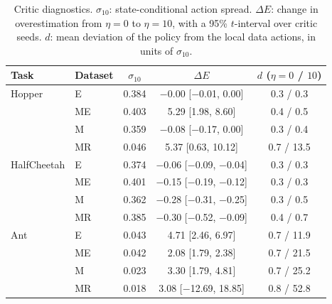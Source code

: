 \begin{table}[t]
\centering
\footnotesize
\caption{Critic diagnostics. $\sigma_{10}$: state-conditional action spread. $\Delta E$: change in overestimation from $\eta=0$ to $\eta=10$, with a 95\% $t$-interval over critic seeds. $d$: mean deviation of the policy from the local data actions, in units of $\sigma_{10}$.}
\label{tab:chain}
\begin{tabular*}{\columnwidth}{@{\extracolsep{\fill}}llccc}
\hline
Task & Dataset & $\sigma_{10}$ & $\Delta E$ & $d$ ($\eta=0$ / $10$) \\
\hline
Hopper & E & 0.384 & $-$0.00 [$-$0.01, 0.00] & 0.3 / 0.3 \\
 & ME & 0.403 & 5.29 [1.98, 8.60] & 0.4 / 0.5 \\
 & M & 0.359 & $-$0.08 [$-$0.17, 0.00] & 0.3 / 0.4 \\
 & MR & 0.046 & 5.37 [0.63, 10.12] & 0.7 / 13.5 \\
\hline
HalfCheetah & E & 0.374 & $-$0.06 [$-$0.09, $-$0.04] & 0.3 / 0.3 \\
 & ME & 0.401 & $-$0.15 [$-$0.19, $-$0.12] & 0.3 / 0.3 \\
 & M & 0.362 & $-$0.28 [$-$0.31, $-$0.25] & 0.3 / 0.5 \\
 & MR & 0.385 & $-$0.30 [$-$0.52, $-$0.09] & 0.4 / 0.7 \\
\hline
Ant & E & 0.043 & 4.71 [2.46, 6.97] & 0.7 / 11.9 \\
 & ME & 0.042 & 2.08 [1.79, 2.38] & 0.7 / 21.5 \\
 & M & 0.023 & 3.30 [1.79, 4.81] & 0.7 / 25.2 \\
 & MR & 0.018 & 3.08 [$-$12.69, 18.85] & 0.8 / 52.8 \\
\hline
\end{tabular*}
\end{table}
